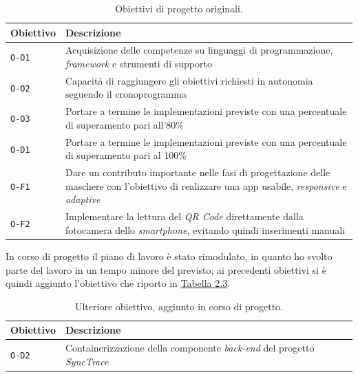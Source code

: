 \begin{table}[h]
  \label{tab:obiettivi-originali}
\begin{tabularx}{\textwidth}{|l|X|}
\hline
\textbf{Obiettivo}           & \textbf{Descrizione}                                                                                                                          \\ \hline
\texttt{O-O1} & Acquisizione delle competenze su linguaggi di programmazione, \textit{framework} e strumenti di supporto                                              \\ \hline
\texttt{O-O2} & Capacità di raggiungere gli obiettivi richiesti in autonomia seguendo il cronoprogramma                                                       \\ \hline
\texttt{O-O3} & Portare a termine le implementazioni previste con una percentuale di superamento pari all'80\%                                                \\ \hline
\texttt{O-D1} & Portare a termine le implementazioni previste con una percentuale di superamento pari al 100\%                                                \\ \hline
\texttt{O-F1} & Dare un contributo importante nelle fasi di progettazione delle maschere con l'obiettivo di realizzare una app usabile, \textit{responsive} e \textit{adaptive} \\ \hline
\texttt{O-F2} & Implementare la lettura del \textit{QR Code} direttamente dalla fotocamera dello \textit{smartphone}, evitando quindi inserimenti manuali                       \\ \hline
\end{tabularx}
\caption{Obiettivi di progetto originali.}
\end{table}

In corso di progetto il piano di lavoro è stato rimodulato, in quanto ho svolto parte del lavoro in un tempo minore del previsto; ai precedenti obiettivi si è quindi aggiunto l'obiettivo che riporto in \hyperref[tab:ulteriore-obiettivo]{Tabella 2.3}.

\begin{table}[h]
  \label{tab:ulteriore-obiettivo}
\begin{tabularx}{\textwidth}{|l|X|}
\hline
\textbf{Obiettivo}           & \textbf{Descrizione}                                                                                                                          \\ \hline
\texttt{O-D2} & Containerizzazione della componente \textit{back-end} del progetto \textit{SyncTrace}                                              \\ \hline
\end{tabularx}
\caption{Ulteriore obiettivo, aggiunto in corso di progetto.}
\end{table}


